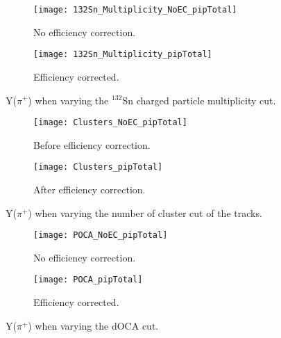 \begin{figure}[!htb]
     \centering
     \begin{subfigure}[b]{\textwidth}
         \centering
         \texttt{[image: 132Sn\_Multiplicity\_NoEC\_pipTotal]}
         \caption{No efficiency correction.}
         \label{fig:pip_multCutVar}
     \end{subfigure}
     \hfill
    \begin{subfigure}[b]{\textwidth}
         \centering
         \texttt{[image: 132Sn\_Multiplicity\_pipTotal]}
         \caption{Efficiency corrected.}
         \label{fig:pip_multCutVar}
     \end{subfigure}
     \hfill
\caption{Y($\pi^+$) when varying the ${}^{132}$Sn charged particle multiplicity cut. }
\label{fig:cutVar}
\end{figure}



\begin{figure}[!htb]
     \centering
     \begin{subfigure}[b]{\textwidth}
         \centering
         \texttt{[image: Clusters\_NoEC\_pipTotal]}
         \caption{Before efficiency correction.}
         \label{fig:pip_clustVar_NoEC}
     \end{subfigure}
     \hfill
    \begin{subfigure}[b]{\textwidth}
         \centering
         \texttt{[image: Clusters\_pipTotal]}
         \caption{After efficiency correction.}
         \label{fig:pip_clustVar_EC}
     \end{subfigure}
     \hfill
\caption{Y($\pi^+$) when varying the number of cluster cut of the tracks.}
\label{fig:pim_clustVar}
\end{figure}




\begin{figure}[!htb]
     \centering
     \begin{subfigure}[b]{\textwidth}
         \centering
         \texttt{[image: POCA\_NoEC\_pipTotal]}
         \caption{No efficiency correction.}
         \label{fig:pip_cutVarPOCA_NoEC}
     \end{subfigure}
     \hfill
    \begin{subfigure}[b]{\textwidth}
         \centering
         \texttt{[image: POCA\_pipTotal]}
         \caption{Efficiency corrected.}
         \label{fig:pip_cutVarPOCA_EC}
     \end{subfigure}
     \hfill
\caption{Y($\pi^+$) when varying the dOCA cut.}
\label{fig:pip_cutVarPOCA}
\end{figure}







